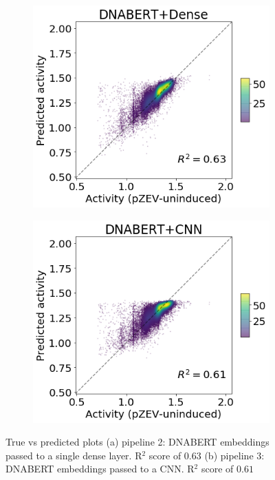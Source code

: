\documentclass{article}
\begin{document}
\begin{figure}[H]
\centering
    \begin{subfigure}{0.49\textwidth}
    \centering
    \includegraphics[width=1\linewidth]{images/dense.png}
    \subcaption{}
    \label{fig:dense}
    \end{subfigure}
    \begin{subfigure}{0.49\textwidth}
    \centering
    \includegraphics[width=1\linewidth]{images/dnabertcnn.png}
    \subcaption{}
    \label{fig:dcnn}
    \end{subfigure}
\caption{True vs predicted plots (a) pipeline 2: DNABERT embeddings passed to a single dense layer. R$^2$ score of $0.63$ (b) pipeline 3: DNABERT embeddings passed to a CNN. R$^2$ score of $0.61$}
\label{fig:dnabertplot}
\end{figure}
\end{document}
